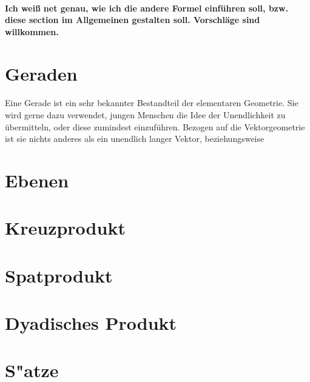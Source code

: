     \paragraph{} \textbf{Ich weiß net genau, wie ich die andere Formel einführen soll, bzw. diese section im Allgemeinen gestalten soll. Vorschläge sind willkommen.}

\section{Geraden}

    \paragraph{} Eine Gerade ist ein sehr bekannter Bestandteil der elementaren Geometrie. Sie wird gerne dazu verwendet, jungen Menschen die Idee
    der Unendlichkeit zu übermitteln, oder diese zumindest einzuführen. Bezogen auf die Vektorgeometrie ist sie nichts anderes als ein unendlich langer Vektor,
     beziehungsweise


\section{Ebenen}
\section{Kreuzprodukt}
\section{Spatprodukt}
\section{Dyadisches Produkt}
\section{S"atze}

